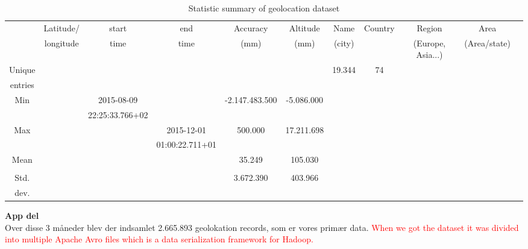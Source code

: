 \begin{table}[htbp]
        \centering
        \small
        \setlength\tabcolsep{2pt}
        \begin{tabular}{|c|c|c|c|c|c|c|c|c|c|c|}
            \hline
                         & Latitude/  &   start             & end               & Accuracy           & Altitude    & Name   & Country & Region             & Area          \\[-3pt]%
                         & longitude  &  time               & time              &  (mm)              & (mm)        & (city) &         & (Europe, Asia...)  & (Area/state)  \\
            \hline
                 Unique  &            &                     &                   &                    &             & 19.344 & 74      &                    &               \\
                 entries &            &                     &                   &                    &             &        &         &                    &               \\
            \hline
                 Min     &            &   2015-08-09        &                   &  -2.147.483.500    & -5.086.000  &        &         &                    &               \\
                         &            &   22:25:33.766+02   &                   &                    &             &        &         &                    &               \\
            \hline
                 Max     &            &                     &   2015-12-01      &  500.000           & 17.211.698  &        &         &                    &               \\
                         &            &                     &  01:00:22.711+01  &                    &             &        &         &                    &               \\
            \hline
                 Mean    &            &                     &                   & 35.249             & 105.030     &        &         &                    &               \\
                         &            &                     &                   &                    &             &        &         &                    &               \\
            \hline
                 Std.    &            &                     &                   & 3.672.390          & 403.966     &        &         &                    &               \\
                 dev.    &            &                     &                   &                    &             &        &         &                    &               \\
            \hline
        \end{tabular}
        \caption{Statistic summary of geolocation dataset}
        \label{tab:Laser_Specs}
\end{table}


\textbf{App del}\\


Over disse 3 måneder blev der indsamlet 2.665.893 geolokation records, som er vores primær data. 
\textcolor{red}{When we got the dataset it was divided into multiple Apache Avro files which is a data serialization framework for Hadoop.\cite{apacheavro}}


